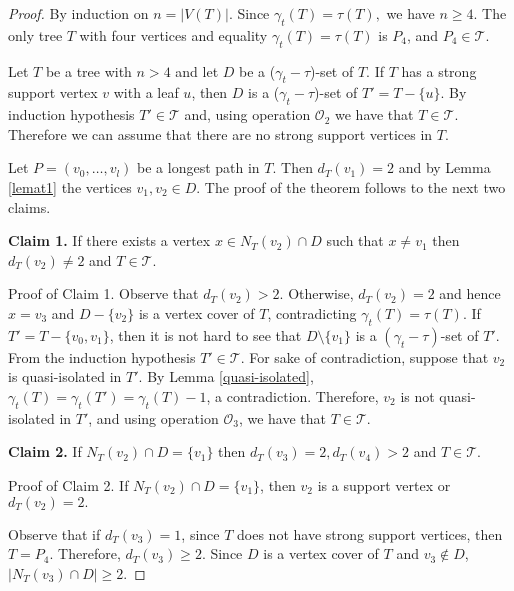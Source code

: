 \documentclass[12pt]{article}%
\theoremstyle{definition}
\newcommand{\gtt}{$(\gamma_t - \tau)$}
\begin{document}
\begin{proof} By induction on $n=|V(T)|$. Since
$\gamma_t (T) = \tau (T),$ we have $n\geq 4.$ The
only tree $T$ with four vertices and equality
$\gamma_t (T) = \tau (T)$ is $P_4$, and $P_4\in
\mathcal{T}$. 

Let $T$ be a tree with $n > 4$ and let $D$ be a
($\gamma_t - \tau $)-set of $T$. If $T$ has a strong
support vertex $v$ with a leaf $u$, then $D$ is a
($\gamma_t - \tau $)-set of $T'=T-\{u\}$. By induction
hypothesis $T'\in \mathcal{T}$ and,  using  operation
$\mathcal{O}_2$ we have that $T \in \mathcal{T}$.
Therefore we can assume that there are no strong
support vertices in $T$.


Let $P=(v_0,\ldots, v_l)$ be a longest path in $T$.
Then $d_T(v_1)=2$ and by Lemma \ref{lemat1} the
vertices $v_1, v_2 \in D$. The proof of the theorem
follows to the next two claims.

\vspace{.2cm}

\textbf{Claim 1.} If there exists a vertex $x\in N_T(v_2)
\cap D$ such that $x\neq v_1$ then $d_T(v_2)\neq 2$
and $T \in \mathcal{T}$.

\vspace{.2cm}

Proof of Claim 1. Observe that $d_T (v_2) > 2$.
Otherwise, $d_T (v_2) = 2$ and hence $x=v_3$ and
$D-\{v_2\}$ is a vertex cover of $T$, contradicting
$\gamma_t(T)=\tau(T)$.   If $T' = T-\{v_0, v_1\}$, then
it is not hard to see that $D \setminus \{v_1\}$ is a
\gtt-set of $T'$. From the induction hypothesis $T'\in
\mathcal{T}$. For sake of contradiction, suppose that 
$v_2$ is quasi-isolated in $T'$.   By Lemma
\ref{quasi-isolated},  $\gamma_t (T) = \gamma_t (T')
= \gamma_t (T) - 1$, a contradiction. Therefore, $v_2$
is not quasi-isolated in $T'$, and using operation
$\mathcal{O}_3$, we have that $T\in \mathcal{T}$.

\vspace{.2cm}

\textbf{Claim 2.} If $N_T(v_2)\cap D=\{v_1\}$ then
$d_T(v_3)=2, d_T(v_4)>2$ and $T \in \mathcal{T}$. 

\vspace{.2cm}

Proof of Claim 2. If $N_T(v_2)\cap D=\{v_1\}$, then
$v_2$ is a support vertex or $d_T(v_2)=2.$ 


Observe that if $d_T(v_3)=1$, since $T$ does not
have strong support vertices, then $T=P_4.$ Therefore,
$d_T(v_3)\geq 2$. Since $D$ is a vertex cover of $T$
and $v_3\notin D$,  $|N_T(v_3)\cap D|\geq 2$.


\end{proof}
\end{document}
